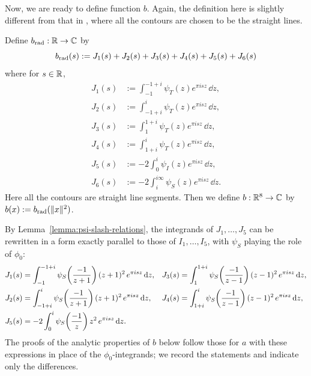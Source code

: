 Now, we are ready to define function $b$.
Again, the definition here is slightly different from that in \cite{Via2017}, where all the contours are chosen to be the straight lines.

\begin{definition}\label{def:b-definition}\leanok
Define $b_{\mathrm{rad}} : \mathbb{R} \to \mathbb{C}$ by
\begin{equation}
    \label{eqn:b-definition}
    b_{\mathrm{rad}}(s) := J_1(s) + J_2(s) + J_3(s) + J_4(s) + J_5(s) + J_6(s)
\end{equation}
where for $s \in \mathbb{R}$,
\begin{align}
    J_1(s) &:= \int_{-1}^{-1 + i} \psi_T(z) e^{\pi i s z} \, \dd z, \label{eqn:J1} \\
    J_2(s) &:= \int_{-1 + i}^{i} \psi_T(z) e^{\pi i s z} \, \dd z, \label{eqn:J2} \\
    J_3(s) &:= \int_{1}^{1 + i} \psi_T(z) e^{\pi i s z} \, \dd z, \label{eqn:J3} \\
    J_4(s) &:= \int_{1 + i}^{i} \psi_T(z) e^{\pi i s z} \, \dd z, \label{eqn:J4} \\
    J_5(s) &:= -2 \int_{0}^{i} \psi_I(z) e^{\pi i s z} \, \dd z, \label{eqn:J5} \\
    J_6(s) &:= -2 \int_{i}^{i \infty} \psi_S(z) e^{\pi i s z} \, \dd z. \label{eqn:J6}
\end{align}
Here all the contours are straight line segments.
Then we define $b : \mathbb{R}^8 \to \mathbb{C}$ by $b(x) := b_{\mathrm{rad}}(\|x\|^2)$.
\end{definition}

By Lemma~\ref{lemma:psi-slash-relations}, the integrands of $J_1, \ldots, J_5$ can be rewritten in a form exactly parallel to those of $I_1, \ldots, I_5$, with $\psi_S$ playing the role of $\phi_0$:
\begin{align}
    J_1(s) &= \int_{-1}^{-1 + i} \psi_S\!\left(\frac{-1}{z + 1}\right) (z + 1)^2\, e^{\pi i s z} \, \mathrm{d} z,
    & J_3(s) &= \int_{1}^{1 + i} \psi_S\!\left(\frac{-1}{z - 1}\right) (z - 1)^2\, e^{\pi i s z} \, \mathrm{d} z, \label{eqn:J-in-psiS-form}\\
    J_2(s) &= \int_{-1 + i}^{i} \psi_S\!\left(\frac{-1}{z + 1}\right) (z + 1)^2\, e^{\pi i s z} \, \mathrm{d} z,
    & J_4(s) &= \int_{1 + i}^{i} \psi_S\!\left(\frac{-1}{z - 1}\right) (z - 1)^2\, e^{\pi i s z} \, \mathrm{d} z, \\
    J_5(s) &= -2\int_{0}^{i} \psi_S\!\left(\frac{-1}{z}\right) z^2\, e^{\pi i s z} \, \mathrm{d} z. 
\end{align}
The proofs of the analytic properties of $b$ below follow those for $a$ with these expressions in place of the $\phi_0$-integrands; we record the statements and indicate only the differences.

